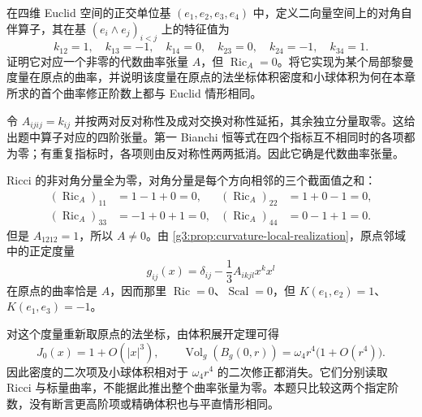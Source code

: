 \begin{exercise}\label{g3:ex:ricci-invisible-local-curvature}
	在四维 Euclid 空间的正交单位基 \((e_1,e_2,e_3,e_4)\) 中，定义二向量空间上的对角自伴算子，其在基 \((e_i\wedge e_j)_{i<j}\) 上的特征值为
	\[
		k_{12}=1,\quad k_{13}=-1,\quad k_{14}=0,\quad
		k_{23}=0,\quad k_{24}=-1,\quad k_{34}=1.
	\]
	证明它对应一个非零的代数曲率张量 \(A\)，但 \(\operatorname{Ric}_A=0\)。将它实现为某个局部黎曼度量在原点的曲率，并说明该度量在原点的法坐标体积密度和小球体积为何在本章所求的首个曲率修正阶数上都与 Euclid 情形相同。
\end{exercise}
\begin{solution}
	令 \(A_{ijij}=k_{ij}\) 并按两对反对称性及成对交换对称性延拓，其余独立分量取零。这给出题中算子对应的四阶张量。第一 Bianchi 恒等式在四个指标互不相同时的各项都为零；有重复指标时，各项则由反对称性两两抵消。因此它确是代数曲率张量。

	Ricci 的非对角分量全为零，对角分量是每个方向相邻的三个截面值之和：
	\[
		\begin{aligned}
		(\operatorname{Ric}_A)_{11}&=1-1+0=0,&
		(\operatorname{Ric}_A)_{22}&=1+0-1=0,\\
		(\operatorname{Ric}_A)_{33}&=-1+0+1=0,&
		(\operatorname{Ric}_A)_{44}&=0-1+1=0.
		\end{aligned}
	\]
	但是 \(A_{1212}=1\)，所以 \(A\ne0\)。由 \cref{g3:prop:curvature-local-realization}，原点邻域中的正定度量
	\[
		g_{ij}(x)=\delta_{ij}-\frac13A_{ikjl}x^kx^l
	\]
	在原点的曲率恰是 \(A\)，因而那里 \(\operatorname{Ric}=0\)、\(\operatorname{Scal}=0\)，但 \(K(e_1,e_2)=1\)、\(K(e_1,e_3)=-1\)。

	对这个度量重新取原点的法坐标，由体积展开定理可得
	\[
		J_0(x)=1+O(|x|^3),\qquad
		\operatorname{Vol}_g(B_g(0,r))
		=\omega_4r^4\bigl(1+O(r^4)\bigr).
	\]
	因此密度的二次项及小球体积相对于 \(\omega_4r^4\) 的二次修正都消失。它们分别读取 Ricci 与标量曲率，不能据此推出整个曲率张量为零。本题只比较这两个指定阶数，没有断言更高阶项或精确体积也与平直情形相同。
\end{solution}
